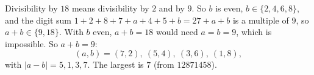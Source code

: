 Divisibility by $18$ means divisibility by $2$ and by $9$. So $b$ is even, $b\in\{2,4,6,8\}$, and the digit sum $1+2+8+7+a+4+5+b=27+a+b$ is a multiple of $9$, so $a+b\in\{9,18\}$. With $b$ even, $a+b=18$ would need $a=b=9$, which is impossible. So $a+b=9$:
\[
(a,b)=(7,2),\ (5,4),\ (3,6),\ (1,8),
\]
with $|a-b|=5,1,3,7$. The largest is $\boxed{7}$ (from $12871458$).
